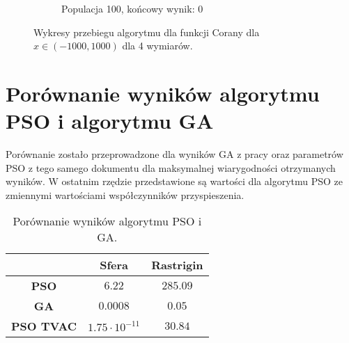 \documentclass[12pt]{article}
\begin{document}
\begin{figure}[H]
\begin{subfigure}{0.32\textwidth}
\begin{adjustbox}{width=\linewidth}
        \end{adjustbox}
        \caption{Populacja 100, końcowy wynik: $0$}
    \end{subfigure}
    \caption{Wykresy przebiegu algorytmu dla funkcji Corany dla $x\in(-1000,1000)$ dla 4 wymiarów.}
\end{figure}

\section{Porównanie wyników algorytmu PSO i algorytmu GA}
Porównanie zostało przeprowadzone dla wyników GA z pracy \cite{comparison} oraz parametrów PSO z tego samego dokumentu dla maksymalnej wiarygodności otrzymanych wyników. W ostatnim rzędzie przedstawione są wartości dla algorytmu PSO ze zmiennymi wartościami współczynników przyspieszenia.
\begin{table}[H]
    \centering
    \begin{tabular}{|c|c|c|}
        \hline
        &\textbf{Sfera}&\textbf{Rastrigin}\\
        \hline
        \textbf{PSO}&$6.22$&$285.09$\\
        \hline
        \textbf{GA}&$0.0008$&$0.05$\\
        \hline
        \textbf{PSO TVAC}&$1.75\cdot 10^{-11}$&$30.84$\\
    \end{tabular}
    \caption{Porównanie wyników algorytmu PSO i GA.}
\end{table}



\end{document}
